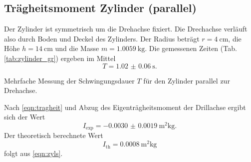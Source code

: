 \subsection{Trägheitsmoment Zylinder (parallel)}
Der Zylinder ist symmetrisch um die Drehachse fixiert.
Die Drechachse verläuft also durch Boden und Deckel des Zylinders.
Der Radius beträgt $r = \SI{4}{\centi\metre}$, die Höhe $h = \SI{14}{\centi\metre}$ und die Masse $m = \SI{1.0059}{\kg}$.
Die gemessenen Zeiten (Tab. \ref{tab:zylinder_gr}) ergeben im Mittel
\begin{equation*}
    T = \SI{1.02(6)}{\second} .
\end{equation*}
\begin{table}
    \centering
    \caption{Mehrfache Messung der Schwingungsdauer $T$ für den Zylinder parallel zur Drehachse.}
    \label{tab:zylinder_gr}
\end{table}
\FloatBarrier
Nach \autoref{eqn:tragheit} und Abzug des Eigenträgheitsmoment der Drillachse ergibt sich der Wert
\begin{equation*}
    I_\text{exp} = \SI{-0.0030(19)}{\metre^2\kg} .
\end{equation*}
Der theoretisch berechnete Wert
\begin{equation*}
    I_\text{th} = \SI{0.0008}{\metre^2\kg}
\end{equation*}
folgt aus \autoref{eqn:zyls}.


